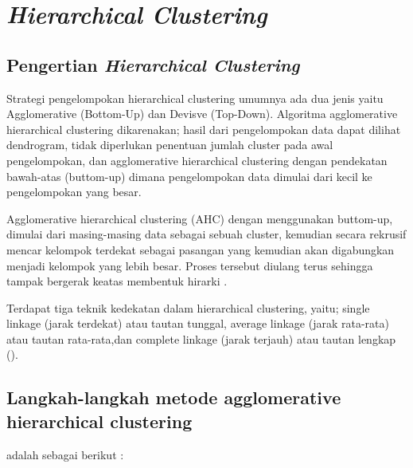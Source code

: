 \section{\textit{Hierarchical Clustering}}
\subsection{Pengertian \textit{Hierarchical Clustering}}
Strategi pengelompokan hierarchical clustering umumnya ada dua jenis yaitu Agglomerative (Bottom-Up) dan Devisve (Top-Down). Algoritma agglomerative hierarchical clustering dikarenakan; hasil dari pengelompokan data dapat dilihat dendrogram, tidak diperlukan penentuan jumlah cluster pada awal pengelompokan, dan agglomerative hierarchical clustering dengan pendekatan bawah-atas (buttom-up) dimana pengelompokan data dimulai dari kecil ke pengelompokan yang besar. 
\par Agglomerative hierarchical clustering (AHC) dengan menggunakan buttom-up, dimulai dari masing-masing data sebagai sebuah cluster, kemudian secara rekrusif mencar kelompok terdekat sebagai pasangan yang kemudian akan digabungkan menjadi kelompok yang lebih besar. Proses tersebut diulang terus sehingga tampak bergerak keatas membentuk hirarki .
\par Terdapat tiga teknik kedekatan dalam hierarchical clustering, yaitu; single linkage (jarak terdekat) atau tautan tunggal, average linkage (jarak rata-rata) atau tautan rata-rata,dan complete linkage (jarak terjauh) atau tautan lengkap (\citep{pujakusuma2017pengelompokan}).
\subsection{Langkah-langkah metode agglomerative hierarchical
clustering}
adalah sebagai berikut \citep*{alpiana2019penerapan} :

